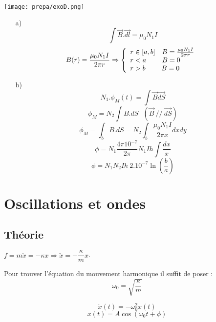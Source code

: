 \documentclass[british,french,11pt, a4paper, openany]{book}
\begin{document}
			\newpage
			\begin{center}
			\texttt{[image: prepa/exoD.png]}\\
			\end{center}
			\begin{itemize}
			\item[a) ] 
			$$\int \vec{B}.\vec{dl} = \mu_0 N_1I$$
			$$B(r) = \frac{\mu_0 N_1I}{2\pi r}
			\Rightarrow \left\{\begin{array}{l}
			r \in [a,b] \ \ \  B = \frac{\mu_0 N_1I}{2\pi r}\\
			r < a\ \ \ \ \ \ \ B = 0\\
			r > b\ \ \ \ \ \ \ B = 0\end{array}\right.\\$$
			
			
			\item[b) ]
			$$N_1. \phi_M(t) = \int \vec{B}\vec{dS}$$
			$$\phi_M = N_2 \int B.dS\ \ \ (\vec{B}\ //\ \vec{dS})$$
			$$\phi_M = \int_b B.dS = N_2 \int_b \frac{\mu_0 N_1 I}{2\pi x} dxdy$$
			$$\phi = N_1 \frac{4\pi 10^{-7}}{2\pi}N_1 I h \int \frac{dx}{x}$$
			$$\phi = N_1 N_2 I h\ 2.10^{-7}\ln\left(\frac{b}{a}\right)$$
			\end{itemize}
			
			
			\newpage
			\section{Oscillations et ondes}
			\subsection{Théorie}
			
			
			$f=m\ddot{x}=-\kappa x \Rightarrow \ddot{x}=-\dfrac{\kappa}{m}x$.
			
			Pour trouver l'équation du mouvement harmonique il suffit de poser : $$ \omega_0=\sqrt{\dfrac{\kappa}{m}} $$
			
			
			$$ \ddot{x}(t)=-\omega_0^2x(t) $$
			$$ x(t)=A\cos(\omega_0t+\phi) $$
			
			
\end{document}
